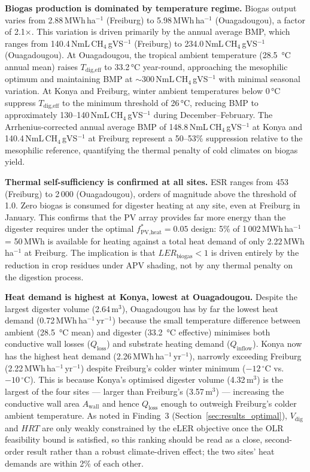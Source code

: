 \textbf{Biogas production is dominated by temperature regime.}
Biogas output varies from 2.88\,MWh\,ha$^{-1}$ (Freiburg) to
5.98\,MWh\,ha$^{-1}$ (Ouagadougou), a factor of 2.1$\times$.
This variation is driven primarily by the annual average BMP, which
ranges from 140.4\,NmL\,CH$_4$\,gVS$^{-1}$ (Freiburg) to
234.0\,NmL\,CH$_4$\,gVS$^{-1}$ (Ouagadougou). At Ouagadougou,
the tropical ambient temperature (\SI{28.5}{\celsius} annual mean)
raises $T_{\text{dig,eff}}$ to 33.2\,\si{\celsius} year-round,
approaching the mesophilic optimum and maintaining BMP at
$\sim$300\,NmL\,CH$_4$\,gVS$^{-1}$ with minimal seasonal
variation. At Konya and Freiburg, winter ambient temperatures
below 0\,\si{\celsius} suppress $T_{\text{dig,eff}}$ to the
minimum threshold of 26\,\si{\celsius}, reducing BMP to
approximately 130--140\,NmL\,CH$_4$\,gVS$^{-1}$ during
December--February. The Arrhenius-corrected annual average BMP
of 148.8\,NmL\,CH$_4$\,gVS$^{-1}$ at Konya and
140.4\,NmL\,CH$_4$\,gVS$^{-1}$ at Freiburg represent a 50--53\%
suppression relative to the mesophilic reference, quantifying
the thermal penalty of cold climates on biogas yield.

\textbf{Thermal self-sufficiency is confirmed at all sites.}
ESR ranges from 453 (Freiburg) to 2\,000 (Ouagadougou), orders of
magnitude above the threshold of 1.0. Zero biogas is consumed for
digester heating at any site, even at Freiburg in January. This
confirms that the PV array provides far more energy than the
digester requires under the optimal $f_{\text{PV,heat}}^* = 0.05$
design: 5\% of 1\,002\,MWh\,ha$^{-1}$ = 50\,MWh is available
for heating against a total heat demand of only
2.22\,MWh\,ha$^{-1}$ at Freiburg. The implication is that
$LER_{\text{biogas}} < 1$ is driven entirely by the reduction in
crop residues under APV shading, not by any thermal penalty on
the digestion process.

\textbf{Heat demand is highest at Konya, lowest at Ouagadougou.}
Despite the largest digester volume (2.64\,m$^3$), Ouagadougou has
by far the lowest heat demand (0.72\,MWh\,ha$^{-1}$\,yr$^{-1}$)
because the small temperature difference between ambient
(\SI{28.5}{\celsius} mean) and digester (\SI{33.2}{\celsius}
effective) minimises both conductive wall losses ($Q_{\text{loss}}$)
and substrate heating demand ($Q_{\text{inflow}}$). Konya now has
the highest heat demand (2.26\,MWh\,ha$^{-1}$\,yr$^{-1}$), narrowly
exceeding Freiburg (2.22\,MWh\,ha$^{-1}$\,yr$^{-1}$) despite
Freiburg's colder winter minimum ($-12\,^{\circ}$C vs.\
$-10\,^{\circ}$C). This is because Konya's optimised digester volume
(4.32\,m$^3$) is the largest of the four sites --- larger than
Freiburg's (3.57\,m$^3$) --- increasing the conductive wall area
$A_{\text{wall}}$ and hence $Q_{\text{loss}}$ enough to outweigh
Freiburg's colder ambient temperature. As noted in Finding~3
(Section~\ref{sec:results_optimal}), $V_{\text{dig}}$ and $HRT$ are
only weakly constrained by the eLER objective once the OLR
feasibility bound is satisfied, so this ranking should be read as a
close, second-order result rather than a robust climate-driven
effect; the two sites' heat demands are within 2\% of each other.

